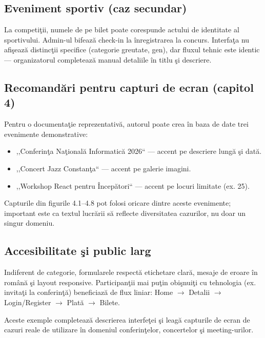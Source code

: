 \subsection{Eveniment sportiv (caz secundar)}

La competi\c tii, numele de pe bilet poate corespunde actului de identitate al sportivului. Admin-ul bifeaz\u a check-in la \^inregistrarea la concurs. Interfa\c ta nu afi\c seaz\u a distinc\c tii specifice (categorie greutate, gen), dar fluxul tehnic este identic — organizatorul completeaz\u a manual detaliile \^in titlu \c si descriere.

\subsection{Recomand\u ari pentru capturi de ecran (capitol 4)}

Pentru o documenta\c tie reprezentativ\u a, autorul poate crea \^in baza de date trei evenimente demonstrative:
\begin{itemize}
	\item ,,Conferin\c ta Na\c tional\u a Informatic\u a 2026`` — accent pe descriere lung\u a \c si dat\u a.
	\item ,,Concert Jazz Constan\c ta`` — accent pe galerie imagini.
	\item ,,Workshop React pentru \^Incep\u atori`` — accent pe locuri limitate (ex. 25).
\end{itemize}

Capturile din figurile 4.1--4.8 pot folosi oricare dintre aceste evenimente; important este ca textul lucr\u arii s\u a reflecte diversitatea cazurilor, nu doar un singur domeniu.


\subsection{Accesibilitate \c si public larg}

Indiferent de categorie, formularele respect\u a etichetare clar\u a, mesaje de eroare \^in rom\^an\u a \c si layout responsive. Participan\c tii mai pu\c tin obi\c snui\c ti cu tehnologia (ex. invita\c ti la conferin\c t\u a) beneficiaz\u a de flux liniar: Home $\rightarrow$ Detalii $\rightarrow$ Login/Register $\rightarrow$ Plat\u a $\rightarrow$ Bilete.

Aceste exemple completeaz\u a descrierea interfe\c tei \c si leag\u a capturile de ecran de cazuri reale de utilizare \^in domeniul conferin\c telor, concertelor \c si meeting-urilor.